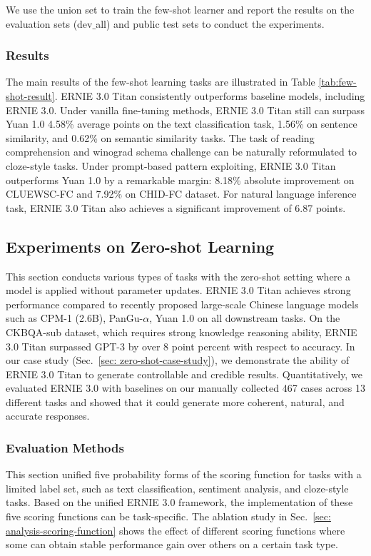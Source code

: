 We use the union set to train the few-shot learner and report the results on the evaluation sets (dev$\_$all) and public test sets to conduct the experiments. 

\subsubsection{Results} 
The main results of the few-shot learning tasks are illustrated in Table \ref{tab:few-shot-result}. ERNIE 3.0 Titan consistently outperforms baseline models, including ERNIE 3.0. Under vanilla fine-tuning methods, ERNIE 3.0 Titan still can surpass Yuan 1.0 4.58\% average points on the text classification task, 1.56\% on sentence similarity, and 0.62\% on semantic similarity tasks. The task of reading comprehension and winograd schema challenge can be naturally reformulated to cloze-style tasks. Under prompt-based pattern exploiting, ERNIE 3.0 Titan outperforms Yuan 1.0 by a remarkable margin: 8.18\% absolute improvement on CLUEWSC-FC and 7.92\% on CHID-FC dataset. For natural language inference task, ERNIE 3.0 Titan also achieves a significant improvement of 6.87 points.

\subsection{Experiments on Zero-shot Learning}\label{sec:zero-shot-tasks} 

This section conducts various types of tasks with the zero-shot setting where a model is applied without parameter updates. ERNIE 3.0 Titan achieves strong performance compared to recently proposed large-scale Chinese language models such as CPM-1 (2.6B), PanGu-$\alpha$, Yuan 1.0 on all downstream tasks. On the CKBQA-sub dataset, which requires strong knowledge reasoning ability, ERNIE 3.0 Titan surpassed GPT-3 by over 8 point percent with respect to accuracy. In our case study (Sec.~\ref{sec: zero-shot-case-study}), we demonstrate the ability of ERNIE 3.0 Titan to generate controllable and credible results. Quantitatively, we evaluated ERNIE 3.0 with baselines on our manually collected 467 cases across 13 different tasks and showed that it could generate more coherent, natural, and accurate responses. 

\subsubsection{Evaluation Methods} 

This section unified five probability forms of the scoring function for tasks with a limited label set, such as text classification, sentiment analysis, and cloze-style tasks. Based on the unified ERNIE 3.0 framework, the implementation of these five scoring functions can be task-specific. The ablation study in Sec.~\ref{sec: analysis-scoring-function} shows the effect of different scoring functions where some can obtain stable performance gain over others on a certain task type.

